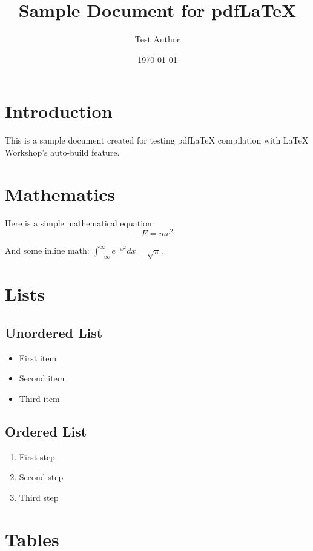 \documentclass[a4paper,12pt]{article}
\title{Sample Document for pdfLaTeX}
\author{Test Author}
\date{\today}
\begin{document}
\maketitle

\section{Introduction}

This is a sample document created for testing pdfLaTeX compilation with LaTeX Workshop's auto-build feature.

\section{Mathematics}

Here is a simple mathematical equation:
\begin{equation}
    E = mc^2
\end{equation}

And some inline math: $\int_{-\infty}^{\infty} e^{-x^2} dx = \sqrt{\pi}$.

\section{Lists}

\subsection{Unordered List}
\begin{itemize}
    \item First item
    \item Second item
    \item Third item
\end{itemize}

\subsection{Ordered List}
\begin{enumerate}
    \item First step
    \item Second step
    \item Third step
\end{enumerate}

\section{Tables}
\end{document}
